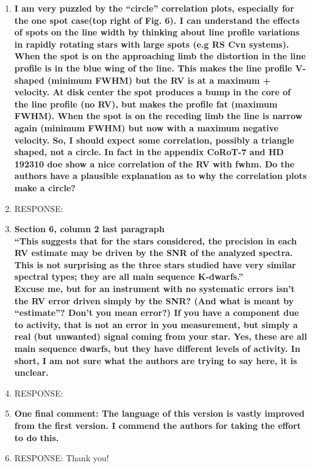 \documentclass[11pt]{article}   	%
\begin{document}
\begin{enumerate}
\item {\bf I am very puzzled by the ``circle'' correlation plots, especially for the one spot case(top right of Fig. 6). I can understand the effects of spots on the line width by thinking about line profile variations in rapidly rotating stars with large spots (e.g RS Cvn systems). When the spot is on the approaching limb the distortion in the line profile is in the blue wing of the line. This makes the line profile V-shaped (minimum FWHM) but the RV is at a maximum + velocity. At disk center the spot produces a bump in the core of the line profile (no RV), but makes the profile fat (maximum FWHM). When the spot is on the receding limb the line is narrow again (minimum FWHM) but now with a maximum negative velocity. So, I should expect some correlation, possibly a triangle shaped, not a circle. In fact in the appendix CoRoT-7 and HD 192310 doe show a nice correlation of the RV with fwhm. Do the authors have a plausible explanation as to why the correlation plots make a circle?}
%
\item[]  RESPONSE:  
\bigskip
%
%
\item {\bf Section 6, column 2 last paragraph\\

``This suggests that for the stars considered, the precision in each RV estimate may be driven by the SNR of the analyzed spectra. This is not surprising as the three stars studied have very similar spectral types; they are all main sequence K-dwarfs.'' \\

Excuse me, but for an instrument with no systematic errors isn't the RV error driven simply by the SNR? (And what is meant by ``estimate''? Don't you mean error?) If you have a component due to activity, that is not an error in you measurement, but simply a real (but unwanted) signal coming from your star. Yes, these are all main sequence dwarfs, but they have different levels of activity. In short, I am not sure what the authors are trying to say here, it is unclear.}
%
\item[]  RESPONSE:  
\bigskip
%
%
\item {\bf One final comment: The language of this version is vastly improved from the first version. I commend the authors for taking the effort to do this.}
%
\item[]  RESPONSE:  Thank you!
\bigskip
%
%
\end{enumerate}
\end{document}
